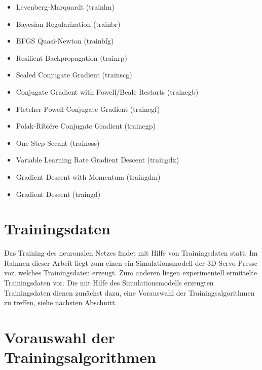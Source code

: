 \begin{itemize}
	\item Levenberg-Marquardt (trainlm)
	\item Bayesian Regularization  (trainbr) 
	\item BFGS Quasi-Newton (trainbfg)
	\item Resilient Backpropagation (trainrp)
	\item Scaled Conjugate Gradient (trainscg)
	\item Conjugate Gradient with Powell/Beale Restarts (traincgb)
	\item Fletcher-Powell Conjugate Gradient (traincgf)
	\item Polak-Ribiére Conjugate Gradient (traincgp)
	\item One Step Secant (trainoss)
	\item Variable Learning Rate Gradient Descent (traingdx)
	\item Gradient Descent with Momentum (traingdm)
	\item Gradient Descent (traingd)
\end{itemize} 


\section{Trainingsdaten}

Das Training des neuronalen Netzes findet mit Hilfe von Trainingsdaten statt. Im Rahmen dieser Arbeit liegt zum einen ein Simulationsmodell der 3D-Servo-Presse vor, welches Trainingsdaten erzeugt. Zum anderen liegen experimentell ermittelte Trainingsdaten vor. Die mit Hilfe des Simulationsmodells erzeugten Trainingsdaten dienen zunächst dazu, eine Vorauswahl der Trainingsalgorithmen zu treffen, siehe nächsten Abschnitt. 



\section{Vorauswahl der Trainingsalgorithmen}

